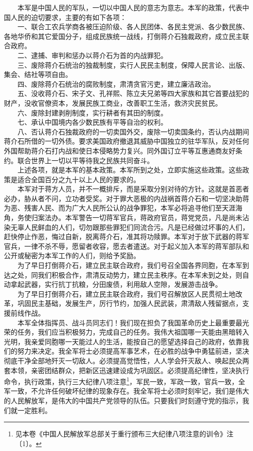\documentclass[cn,11pt,chinese]{elegantbook}
\begin{document}
　　本军是中国人民的军队，一切以中国人民的意志为意志。本军的政策，代表中国人民的迫切要求，主要的有如下各项：\\
　　一、联合工农兵学商各被压迫阶级、各人民团体、各民主党派、各少数民族、各地华侨和其它爱国分子，组成民族统一战线，打倒蒋介石独裁政府，成立民主联合政府。\\
　　二、逮捕、审判和惩办以蒋介石为首的内战罪犯。\\
　　三、废除蒋介石统治的独裁制度，实行人民民主制度，保障人民言论、出版、集会、结社等项自由。\\
　　四、废除蒋介石统治的腐败制度，肃清贪官污吏，建立廉洁政治。\\
　　五、没收蒋介石、宋子文、孔祥熙、陈立夫兄弟等四大家族和其它首要战犯的财产，没收官僚资本，发展民族工商业，改善职工生活，救济灾民贫民。\\
　　六、废除封建剥削制度，实行耕者有其田的制度。\\
　　七、承认中国境内各少数民族有平等自治的权利。\\
　　八、否认蒋介石独裁政府的一切卖国外交，废除一切卖国条约，否认内战期间蒋介石所借的一切外债。要求美国政府撤退其威胁中国独立的驻华军队，反对任何外国帮助蒋介石打内战和使日本侵略势力复兴。同外国订立平等互惠通商友好条约。联合世界上一切以平等待我之民族共同奋斗。\\
　　上述各项，就是本军的基本政策。本军所到之处，立即实施这些政策。这些政策是适合全国百分之九十以上人民的要求的。\\
　　本军对于蒋方人员，并不一概排斥，而是采取分别对待的方针。这就是首恶者必办，胁从者不问，立功者受奖。对于罪大恶极的内战祸首蒋介石和一切坚决助蒋为恶、残害人民、而为广大人民所公认的战争罪犯，本军必将追寻他们至天涯海角，务使归案法办。本军警告一切蒋军官兵，蒋政府官员，蒋党党员，凡是尚未沾染无辜人民鲜血的人们，切勿跟那些罪犯们同流合污。凡是已经做过坏事的人们，赶快停止作恶，悔过自新，脱离蒋介石，准其将功赎罪。本军对于放下武器的蒋军官兵，一律不杀不辱，愿留者收容，愿去者遣送。对于起义加入本军的蒋军部队和公开或秘密为本军工作的人们，则给予奖励。\\
　　为了早日打倒蒋介石，建立民主联合政府，我们号召全国各界同胞，在本军到达之处，同我们积极合作，肃清反动势力，建立民主秩序。在本军未到之处，则自动拿起武器，实行抗丁抗粮，分田废债，利用敌人空隙，发展游击战争。\\
　　为了早日打倒蒋介石，建立民主联合政府，我们号召解放区人民贯彻土地改革，巩固民主基础，发展生产，厉行节约，加强人民武装，肃清敌人残留据点，支援前线作战。\\
　　本军全体指挥员、战斗员同志们！我们现在担负了我国革命历史上最重要最光荣的任务，我们应当积极努力，完成自己的任务。我伟大祖国哪一天能由黑暗转入光明，我亲爱同胞哪一天能过人的生活，能按自己的愿望选择自己的政府，依靠我们的努力来决定。我全军将士必须提高军事艺术，在必胜的战争中勇猛前进，坚决彻底干净全部地歼灭一切敌人。必须提高觉悟性，人人学会歼灭敌人、唤起民众两套本领，亲密团结群众，把新区迅速建设成为巩固区。必须提高纪律性，坚决执行命令，执行政策，执行三大纪律八项注意\footnote[8]{ 见本卷《中国人民解放军总部关于重行颁布三大纪律八项注意的训令》注〔1〕。}，军民一致，军政一致，官兵一致，全军一致，不允许任何破坏纪律的现象存在。我全军将士必须时刻牢记，我们是伟大的人民解放军，是伟大的中国共产党领导的队伍。只要我们时刻遵守党的指示，我们就一定胜利。\\
\end{document}
